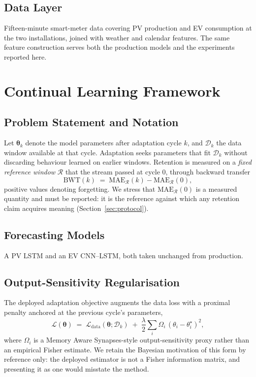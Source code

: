 \documentclass[journal]{IEEEtran}
\newcommand{\params}{\boldsymbol{\theta}}
\newcommand{\ewclambda}{\lambda}
\begin{document}
\subsection{Data Layer}
Fifteen-minute smart-meter data covering PV production and EV consumption at the
two installations, joined with weather and calendar features. The same feature
construction serves both the production models and the experiments reported
here.

\section{Continual Learning Framework}
\label{sec:cl}

\subsection{Problem Statement and Notation}
Let $\params_k$ denote the model parameters after adaptation cycle $k$, and
$\mathcal{D}_k$ the data window available at that cycle. Adaptation seeks
parameters that fit $\mathcal{D}_k$ without discarding behaviour learned on
earlier windows. Retention is measured on a \emph{fixed reference window}
$\mathcal{R}$ that the stream passed at cycle $0$, through backward transfer
\begin{equation}
\mathrm{BWT}(k) \;=\; \mathrm{MAE}_{\mathcal{R}}(k) - \mathrm{MAE}_{\mathcal{R}}(0),
\label{eq:bwt}
\end{equation}
positive values denoting forgetting. We stress that
$\mathrm{MAE}_{\mathcal{R}}(0)$ is a measured quantity and must be reported: it
is the reference against which any retention claim acquires meaning
(Section~\ref{sec:protocol}).

\subsection{Forecasting Models}
A PV LSTM and an EV CNN--LSTM, both taken unchanged from production.

\subsection{Output-Sensitivity Regularisation}
\label{sec:osr}
The deployed adaptation objective augments the data loss with a proximal
penalty anchored at the previous cycle's parameters,
\begin{equation}
\mathcal{L}(\params) \;=\; \mathcal{L}_{\mathrm{data}}(\params;\mathcal{D}_k)
\;+\; \frac{\ewclambda}{2}\sum_i \Omega_i\,(\theta_i - \theta^{\star}_i)^2 ,
\label{eq:osr}
\end{equation}
where $\Omega_i$ is a Memory Aware Synapses-style output-sensitivity proxy
rather than an empirical Fisher estimate. We retain the Bayesian motivation of
this form by reference only: the deployed estimator is not a Fisher information
matrix, and presenting it as one would misstate the method.
\end{document}
